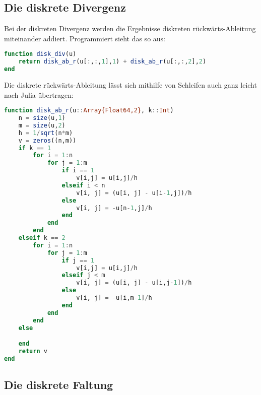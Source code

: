 \documentclass{article}
\theoremstyle{case}
\begin{document}
\subsection{Die diskrete Divergenz}
Bei der diskreten Divergenz werden die Ergebnisse diskreten rückwärts-Ableitung miteinander addiert. Programmiert sieht das so aus:
\begin{lstlisting}[language=Julia]
function disk_div(u)
	return disk_ab_r(u[:,:,1],1) + disk_ab_r(u[:,:,2],2)
end
\end{lstlisting}
Die diskrete rückwärts-Ableitung lässt sich mithilfe von Schleifen auch ganz leicht nach Julia übertragen:
\begin{lstlisting}[language=Julia]
function disk_ab_r(u::Array{Float64,2}, k::Int)
	n = size(u,1)
	m = size(u,2)
	h = 1/sqrt(n*m)
	v = zeros((n,m))
	if k == 1
		for i = 1:n
			for j = 1:m
				if i == 1
					v[i,j] = u[i,j]/h
				elseif i < n
					v[i, j] = (u[i, j] - u[i-1,j])/h
				else
					v[i, j] = -u[n-1,j]/h
				end
			end
		end
	elseif k == 2
		for i = 1:n
			for j = 1:m
				if j == 1
					v[i,j] = u[i,j]/h
				elseif j < m
					v[i, j] = (u[i, j] - u[i,j-1])/h
				else
					v[i, j] = -u[i,m-1]/h
				end
			end
		end
	else

	end
	return v
end
\end{lstlisting}




\subsection{Die diskrete Faltung}
\end{document}
